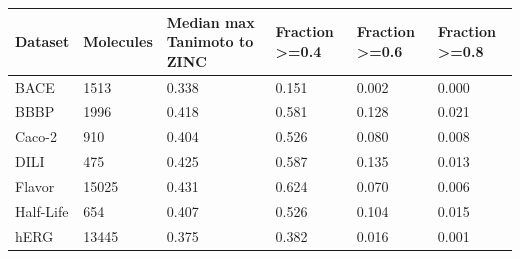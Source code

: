 \begin{tabular}{llllll}
\toprule
Dataset & Molecules & Median max Tanimoto to ZINC & Fraction >=0.4 & Fraction >=0.6 & Fraction >=0.8 \\
\midrule
BACE & 1513 & 0.338 & 0.151 & 0.002 & 0.000 \\
BBBP & 1996 & 0.418 & 0.581 & 0.128 & 0.021 \\
Caco-2 & 910 & 0.404 & 0.526 & 0.080 & 0.008 \\
DILI & 475 & 0.425 & 0.587 & 0.135 & 0.013 \\
Flavor & 15025 & 0.431 & 0.624 & 0.070 & 0.006 \\
Half-Life & 654 & 0.407 & 0.526 & 0.104 & 0.015 \\
hERG & 13445 & 0.375 & 0.382 & 0.016 & 0.001 \\
\bottomrule
\end{tabular}

